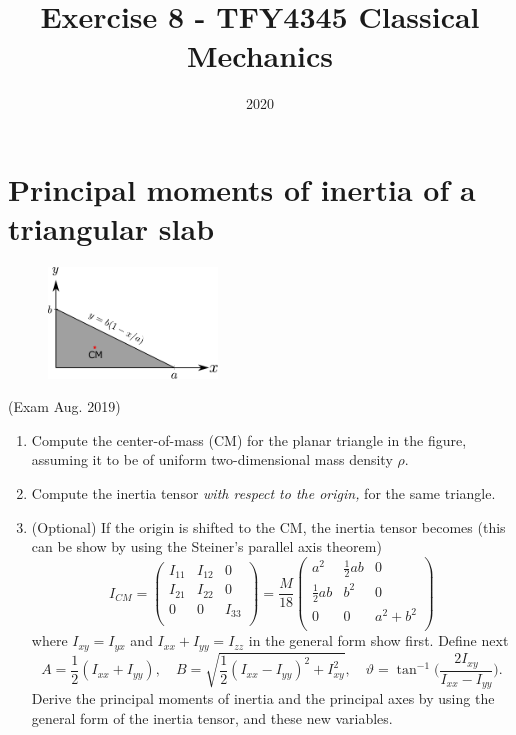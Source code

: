 \documentclass{article}
\title{Exercise 8 - TFY4345 Classical Mechanics}
\date{2020}
\begin{document}
    \maketitle
    \section{Principal moments of inertia of a triangular slab}
    \begin{figure}
        \includegraphics[width=0.4\textwidth]{figures/exercise_1_triangle.pdf}
    \end{figure}\leavevmode
    (Exam Aug. 2019) \\
    \begin{enumerate}[label=(\alph*)]
        \item Compute the center-of-mass (CM) for the planar triangle in the figure, assuming it to be of uniform two-dimensional mass density $\rho$.
        \item Compute the inertia tensor \emph{with respect to the origin,} for the same triangle.
        \item (Optional) If the origin is shifted to the CM, the inertia tensor becomes (this can be show by using the Steiner's parallel axis theorem)
        \begin{equation*}
            I_{CM} = 
            \begin{pmatrix*}
                I_{11} & I_{12} & 0 \\
                I_{21} & I_{22} & 0 \\
                0 & 0 & I_{33} \\
            \end{pmatrix*}
             =\frac{M}{18} 
            \begin{pmatrix*}
                a^2 & \frac{1}{2}ab & 0 \\
                \frac{1}{2}ab & b^2 & 0 \\
                0 & 0 & a^2 + b^2 \\
            \end{pmatrix*}
        \end{equation*}
        where $I_{xy} = I_{yx}$ and $I_{xx} + I_{yy} = I_{zz}$ in the general form show first. Define next
        \begin{equation*}
            A = \frac{1}{2}(I_{xx} + I_{yy}), \quad B = \sqrt{\frac{1}{2}(I_{xx} - I_{yy})^2 + I_{xy}^2}, \quad \vartheta = \tan^{-1}\bigg( \frac{2I_{xy}}{I_{xx} - I_{yy}}\bigg).
        \end{equation*}
        Derive the principal moments of inertia and the principal axes by using the general form of the inertia tensor, and these new variables.
    \end{enumerate}
\end{document}
